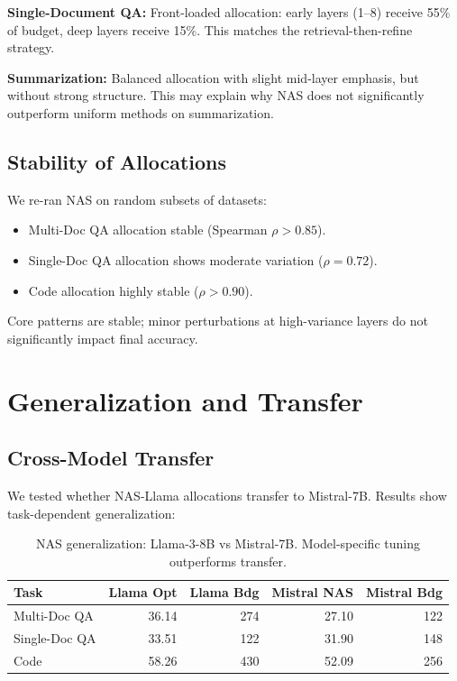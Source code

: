 \documentclass[11pt]{article}
\begin{document}
\textbf{Single-Document QA:} Front-loaded allocation: early layers (1–8) receive 55\% of budget, deep layers receive 15\%. This matches the retrieval-then-refine strategy.

\textbf{Summarization:} Balanced allocation with slight mid-layer emphasis, but without strong structure. This may explain why NAS does not significantly outperform uniform methods on summarization.

\subsection{Stability of Allocations}

We re-ran NAS on random subsets of datasets:
\begin{itemize}
    \item Multi-Doc QA allocation stable (Spearman $\rho > 0.85$).
    \item Single-Doc QA allocation shows moderate variation ($\rho = 0.72$).
    \item Code allocation highly stable ($\rho > 0.90$).
\end{itemize}

Core patterns are stable; minor perturbations at high-variance layers do not significantly impact final accuracy.

\section{Generalization and Transfer}

\subsection{Cross-Model Transfer}

We tested whether NAS-Llama allocations transfer to Mistral-7B. Results show task-dependent generalization:

\begin{table}[h]
\centering
\footnotesize
\renewcommand{\arraystretch}{1.2}
\begin{tabular}{@{}l r r r r@{}}
\toprule
\textbf{Task} & \textbf{Llama Opt} & \textbf{Llama Bdg} & \textbf{Mistral NAS} & \textbf{Mistral Bdg} \\
\midrule
Multi-Doc QA & 36.14 & 274 & 27.10 & 122 \\
Single-Doc QA & 33.51 & 122 & 31.90 & 148 \\
Code & 58.26 & 430 & 52.09 & 256 \\
\bottomrule
\end{tabular}
\caption{NAS generalization: Llama-3-8B vs Mistral-7B. Model-specific tuning outperforms transfer.}
\label{tab:transfer}
\end{table}
\end{document}
